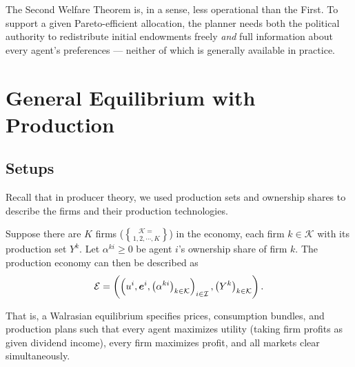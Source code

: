 The Second Welfare Theorem is, in a sense, less operational than the
First. To support a given Pareto-efficient allocation, the planner
needs both the political authority to redistribute initial endowments
freely \emph{and} full information about every agent's preferences —
neither of which is generally available in practice.

\section{General Equilibrium with Production}\label{ge-with-production}

\subsection{Setups}

Recall that in producer theory, we used production sets and ownership
shares to describe the firms and their production technologies.

Suppose there are \(K\) firms (\(\mathcal K = \brace{1,2,\cdots,K}\)) in the economy, each firm $k\in \mathcal K$ with its production set \(Y^k\). Let \(\alpha^{ki}\ge0\) be agent
\(i\)'s ownership share of firm \(k\). The production
economy can then be described as
\[\mathcal E = \left(\left(u^i,\bm e^i,\left(\alpha^{ki}\right)_{k\in \mathcal K}\right)_{i\in\mathcal I},\left(Y^k\right)_{k\in \mathcal K}\right).\]


That is, a Walrasian equilibrium specifies prices, consumption
bundles, and production plans such that every agent maximizes utility
(taking firm profits as given dividend income), every firm maximizes
profit, and all markets clear simultaneously.

